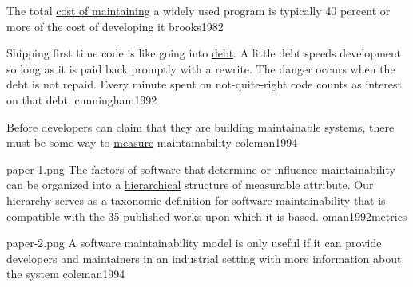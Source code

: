 \documentclass{article}
\begin{document}


  {The total \ul{cost of maintaining} a widely used program is typically 40 percent or more of the cost of developing it}
  {brooks1982}

  {Shipping first time code is like going into \ul{debt}. A little debt speeds development so long as it is paid back promptly with a rewrite. The danger occurs when the debt is not repaid. Every minute spent on not-quite-right code counts as interest on that debt.}
  {cunningham1992}

  {Before developers can claim that they are building maintainable systems, there must be some way to \ul{measure} maintainability}
  {coleman1994}

\qte
  {paper-1.png}
  {The factors of software that determine or influence maintainability can be organized into a \ul{hierarchical} structure of measurable attribute. Our hierarchy serves as a taxonomic definition for software maintainability that is compatible with the 35 published works upon which it is based.}
  {oman1992metrics}



\qte
  {paper-2.png}
  {A software maintainability model is only useful if it can provide developers and maintainers in an industrial setting with more information about the system}
  {coleman1994}
\end{document}
